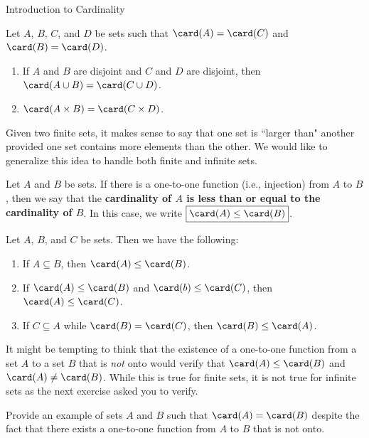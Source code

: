 \begin{section}{Introduction to Cardinality}
\begin{theorem}
Let $A$, $B$, $C$, and $D$ be sets such that $\card(A)=\card(C)$ and $\card(B)=\card(D)$.
\begin{enumerate}[label=\textrm{(\alph*)}]
\item If $A$ and $B$ are disjoint and $C$ and $D$ are disjoint, then $\card(A\cup B)=\card(C\cup D)$.
\item $\card(A\times B)=\card(C\times D)$.
\end{enumerate}
\end{theorem}

Given two finite sets, it makes sense to say that one set is ``larger than" another provided one set contains more elements than the other. We would like to generalize this idea to handle both finite and infinite sets. 

\begin{definition}
Let $A$ and $B$ be sets. If there is a one-to-one function (i.e., injection) from $A$ to $B$, then we say that the \textbf{cardinality of $A$ is less than or equal to the cardinality of $B$}. In this case, we write $\boxed{\card(A)\leq\card(B)}$.
\end{definition}

\begin{theorem}
Let $A$, $B$, and $C$ be sets. Then we have the following:
\begin{enumerate}[label=\textrm{(\alph*)}]
\item If $A\subseteq B$, then $\card(A)\leq \card(B)$.
\item If $\card(A)\leq \card(B)$ and $\card(b)\leq \card(C)$, then $\card(A)\leq \card(C)$.
\item If $C\subseteq A$ while $\card(B)=\card(C)$, then $\card(B)\leq \card(A)$.
\end{enumerate}
\end{theorem}

It might be tempting to think that the existence of a one-to-one function from a set $A$ to a set $B$ that is \emph{not} onto would verify that $\card(A)\leq \card(B)$ and $\card(A)\neq \card(B)$. While this is true for finite sets, it is not true for infinite sets as the next exercise asked you to verify.

\begin{exercise}
Provide an example of sets $A$ and $B$ such that $\card(A)=\card(B)$ despite the fact that there exists a one-to-one function from $A$ to $B$ that is not onto.
\end{exercise}


\end{section}
